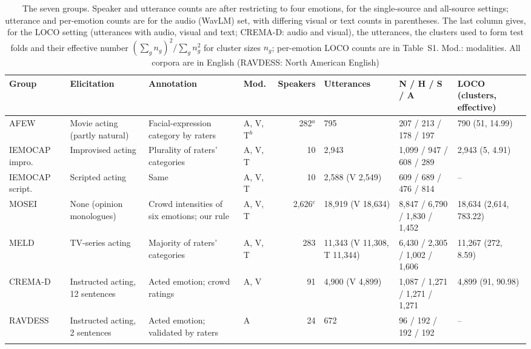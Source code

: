 \begin{table}[t]
\caption{The seven groups. Speaker and utterance counts are after restricting to four emotions, for the single-source and all-source settings; utterance and per-emotion counts are for the audio (WavLM) set, with differing visual or text counts in parentheses. The last column gives, for the LOCO setting (utterances with audio, visual and text; CREMA-D: audio and visual), the utterances, the clusters used to form test folds and their effective number $(\sum_g n_g)^2/\sum_g n_g^2$ for cluster sizes $n_g$; per-emotion LOCO counts are in Table~S1. Mod.: modalities. All corpora are in English (RAVDESS: North American English)}\label{tab:corpora}
\footnotesize\setlength{\tabcolsep}{3pt}
\begin{tabular}{@{}p{1.55cm}p{1.7cm}p{1.95cm}p{0.75cm}r p{1.5cm}p{1.7cm}p{1.35cm}@{}}
\toprule
Group & Elicitation & Annotation & Mod. & Speakers & Utterances & N / H / S / A & LOCO (clusters, effective) \\
\midrule
AFEW \cite{dhall2012afew,dhall2013emotiw} & Movie acting (partly natural) & Facial-expression category by raters & A, V, T$^{b}$ & 282$^{a}$ & 795 & 207 / 213 / 178 / 197 & 790 (51, 14.99) \\
IEMOCAP impro.\ \cite{busso2008iemocap} & Improvised acting & Plurality of raters' categories & A, V, T & 10 & 2,943 & 1,099 / 947 / 608 / 289 & 2,943 (5, 4.91) \\
IEMOCAP script.\ \cite{busso2008iemocap} & Scripted acting & Same & A, V, T & 10 & 2,588 (V 2,549) & 609 / 689 / 476 / 814 & -- \\
MOSEI \cite{zadeh2018mosei} & None (opinion monologues) & Crowd intensities of six emotions; our rule & A, V, T & 2,626$^{c}$ & 18,919 (V 18,634) & 8,847 / 6,790 / 1,830 / 1,452 & 18,634 (2,614, 783.22) \\
MELD \cite{poria2019meld} & TV-series acting & Majority of raters' categories & A, V, T & 283 & 11,343 (V 11,308, T 11,344) & 6,430 / 2,305 / 1,002 / 1,606 & 11,267 (272, 8.59) \\
CREMA-D \cite{cao2014cremad} & Instructed acting, 12 sentences & Acted emotion; crowd ratings & A, V & 91 & 4,900 (V 4,899) & 1,087 / 1,271 / 1,271 / 1,271 & 4,899 (91, 90.98) \\
RAVDESS \cite{livingstone2018ravdess} & Instructed acting, 2 sentences & Acted emotion; validated by raters & A & 24 & 672 & 96 / 192 / 192 / 192 & -- \\
\botrule
\end{tabular}
\end{table}

